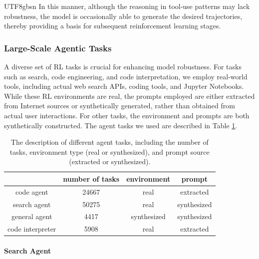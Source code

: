 \documentclass[11pt, a4paper, logo, copyright, nonumbering]{deepseek}
\begin{document}
\begin{CJK*}{UTF8}{gbsn}
In this manner, although the reasoning in tool‑use patterns may lack robustness, the model is occasionally able to generate the desired trajectories, thereby providing a basis for subsequent reinforcement learning stages.

\subsubsection{Large-Scale Agentic Tasks}

A diverse set of RL tasks is crucial for enhancing model robustness. For tasks such as search, code engineering, and code interpretation, we employ real-world tools, including actual web search APIs, coding tools, and Jupyter Notebooks. While these RL environments are real, the prompts employed are either extracted from Internet sources or synthetically generated, rather than obtained from actual user interactions.
For other tasks,  the environment and prompts are both synthetically constructed. The agent tasks we used are described in Table \ref{tab:description}.

\begin{table}[h]
\centering
\caption{The description of different agent tasks, including the number of tasks, environment type (real or synthesized), and prompt source (extracted or synthesized). \label{tab:description} } 
\begin{tabular}{c|c|c|c}
\hline
 & number of tasks & environment & prompt \\
\hline
code agent & 24667 & real & extracted \\
\hline
search agent& 50275 & real & synthesized \\
\hline
general agent & 4417& synthesized & synthesized\\
\hline
code interpreter & 5908 & real & extracted \\
\hline
\end{tabular}

\end{table}

\paragraph{Search Agent}


\end{CJK*}
\end{document}
